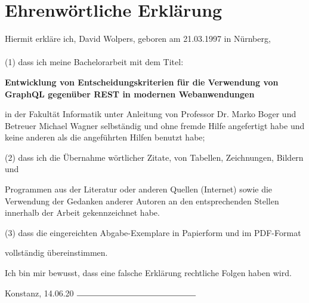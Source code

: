 \chapter*{Ehrenwörtliche Erklärung}

Hiermit erkläre ich, David Wolpers, geboren am 21.03.1997 in Nürnberg, \\
\\
(1)	dass ich meine Bachelorarbeit mit dem Titel:\\
\begin{center}
\textbf{Entwicklung von Entscheidungskriterien für die Verwendung von GraphQL gegenüber REST in modernen Webanwendungen}
\end{center}
\begin{addmargin}[1.5em]{0em}
\begin{flushleft}
in der Fakultät Informatik unter Anleitung von Professor Dr. Marko Boger und Betreuer Michael Wagner selbständig und ohne fremde Hilfe angefertigt habe und keine anderen als die angeführten Hilfen benutzt habe;
\end{flushleft}
\end{addmargin}

\begin{flushleft}
(2)	dass ich die Übernahme wörtlicher Zitate, von Tabellen, Zeichnungen, Bildern und 
\begin{addmargin}[1.5em]{0em}
Programmen aus der Literatur oder anderen Quellen (Internet) sowie die Verwendung der Gedanken anderer Autoren an den entsprechenden Stellen innerhalb der Arbeit gekennzeichnet habe.
\end{addmargin}
\end{flushleft}
\begin{flushleft}
(3)	dass die eingereichten Abgabe-Exemplare in Papierform und im PDF-Format 
\begin{addmargin}[1.5em]{0em}
vollständig übereinstimmen.
\end{addmargin}
\end{flushleft}
\begin{addmargin}[0.5em]{0em}
Ich bin mir bewusst, dass eine falsche Erklärung rechtliche Folgen haben wird.
\end{addmargin}
\vspace{\baselineskip}


Konstanz, 14.06.20	 \hspace{3cm} $\rule{5cm}{0.15mm}$
